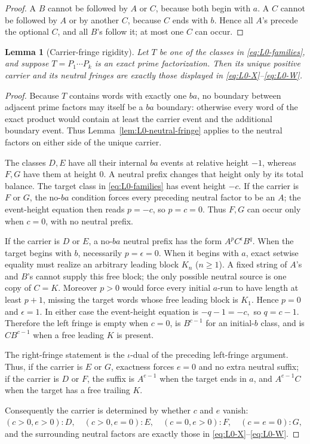 \documentclass[11pt,a4paper]{article}
\newtheorem{lemma}[theorem]{Lemma}
\begin{document}
\begin{proof}
A $B$ cannot be followed by $A$ or $C$, because both begin with $a$.
A $C$ cannot be followed by $A$ or by another $C$, because $C$ ends
with $b$.  Hence all $A$'s precede the optional $C$, and all $B$'s
follow it; at most one $C$ can occur.
\end{proof}

\begin{lemma}[Carrier-fringe rigidity]
\label{lem:L0-carrier-fringe}
Let $T$ be one of the classes in \eqref{eq:L0-families}, and suppose
$T=P_1\cdots P_k$ is an exact prime factorization.  Then its unique
positive carrier and its neutral fringes are exactly those displayed
in \eqref{eq:L0-X}--\eqref{eq:L0-W}.
\end{lemma}

\begin{proof}
Because $T$ contains words with exactly one $ba$, no boundary between
adjacent prime factors may itself be a $ba$ boundary: otherwise every
word of the exact product would contain at least the carrier event and
the additional boundary event.  Thus Lemma~\ref{lem:L0-neutral-fringe}
applies to the neutral factors on either side of the unique carrier.

The classes $D,E$ have all their internal $ba$ events at relative
height $-1$, whereas $F,G$ have them at height $0$.  A neutral prefix
changes that height only by its total balance.  The target class in
\eqref{eq:L0-families} has event height $-c$.  If the carrier is $F$ or $G$, the
no-$ba$ condition forces every preceding neutral factor to be an $A$;
the event-height equation then reads $p=-c$, so $p=c=0$.  Thus $F,G$
can occur only when $c=0$, with no neutral prefix.

If the carrier is $D$ or $E$, a no-$ba$ neutral prefix has the form
$A^pC^\epsilon B^q$.  When the target begins with $b$, necessarily
$p=\epsilon=0$.  When it begins with $a$, exact setwise equality must
realize an arbitrary leading block $K_n$ ($n\ge1$).  A fixed string of
$A$'s and $B$'s cannot supply this free block; the only possible neutral
source is one copy of $C=K$.  Moreover $p>0$ would force every initial
$a$-run to have length at least $p+1$, missing the target words whose
free leading block is $K_1$.  Hence $p=0$ and $\epsilon=1$.  In either
case the event-height equation is
\(-q-1=-c,\)
so $q=c-1$.  Therefore the left fringe is empty when $c=0$, is
$B^{c-1}$ for an initial-$b$ class, and is $CB^{c-1}$ when a free
leading $K$ is present.

The right-fringe statement is the $\iota$-dual of the preceding
left-fringe argument.  Thus, if the carrier is $E$ or $G$, exactness
forces $e=0$ and no extra neutral suffix; if the carrier is $D$ or $F$,
the suffix is $A^{e-1}$ when the target ends in $a$, and $A^{e-1}C$
when the target has a free trailing $K$.

Consequently the carrier is determined by whether $c$ and $e$ vanish:
\((c>0,e>0):D, \quad (c>0,e=0):E, \quad (c=0,e>0):F, \quad (c=e=0):G,\)
and the surrounding neutral factors are exactly those in
\eqref{eq:L0-X}--\eqref{eq:L0-W}.
\end{proof}
\end{document}
